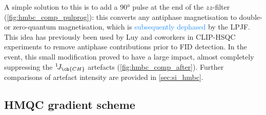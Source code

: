\documentclass[a4paper,11pt]{article}
\newcommand{\carbon}{\ch{^{13}C}}
\newcommand{\nitrogen}{\ch{^{15}N}}
\newcommand{\changed}[1]{\textcolor{DodgerBlue}{#1}}
\newcommand{\onejch}{{}^1\!J_{\ch{CH}}}
\begin{document}
\begin{refsection}
A simple solution to this is to add a \carbon{} \ang{90} pulse at the end of the \(zz\)-filter (\cref{fig:hmbc_comp_pulprog}): this converts any antiphase magnetisation to double- or zero-quantum magnetisation, which is \changed{subsequently dephased} by the LPJF.
This idea has previously been used by Luy and coworkers in CLIP-HSQC experiments to remove antiphase contributions prior to FID detection.\autocite{Enthart2008JMR}
In the event, this small modification proved to have a large impact, almost completely suppressing the \(\onejch\) artefacts (\cref{fig:hmbc_comp_after}).
Further comparisons of artefact intensity are provided in \cref{sec:si_hmbc}.

\subsection{\texorpdfstring{\nitrogen{}}{15N} HMQC gradient scheme}


\end{refsection}
\end{document}
